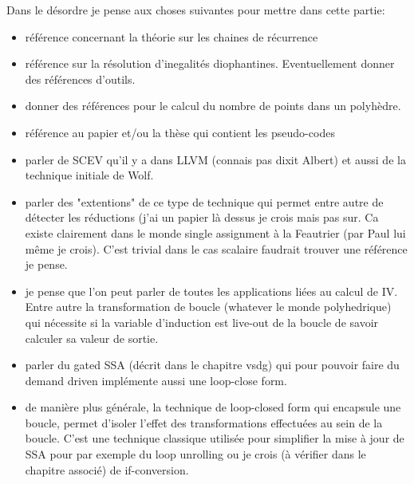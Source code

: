 Dans le désordre je pense aux choses suivantes pour mettre dans cette partie:
\begin{itemize}
\item référence concernant la théorie sur les chaines de récurrence
\item référence sur la résolution d'inegalités diophantines. Eventuellement donner des références d'outils.
\item donner des références pour le calcul du nombre de points dans un polyhèdre.
\item référence au papier et/ou la thèse qui contient les pseudo-codes 
\item parler de SCEV qu'il y a dans LLVM (connais pas dixit Albert) et aussi de la technique initiale de Wolf.
\item parler des "extentions" de ce type de technique qui permet entre autre de détecter les réductions (j'ai un papier là dessus je crois mais pas sur. Ca existe clairement dans le monde single assignment à la Feautrier (par Paul lui même je crois). C'est trivial dans le cas scalaire faudrait trouver une référence je pense.
\item je pense que l'on peut parler de toutes les applications liées au calcul de IV. Entre autre la transformation de boucle (whatever le monde polyhedrique) qui nécessite si la variable d'induction est live-out de la boucle de savoir calculer sa valeur de sortie.
\item parler du gated SSA (décrit dans le chapitre vsdg) qui pour pouvoir faire du demand driven implémente aussi une loop-close form.
\item de manière plus générale, la technique de loop-closed form qui encapsule une boucle, permet d'isoler l'effet des transformations effectuées au sein de la boucle. C'est une technique classique utilisée pour simplifier la mise à jour de SSA pour par exemple du loop unrolling ou je crois (à vérifier dans le chapitre associé) de if-conversion.
\end{itemize}

